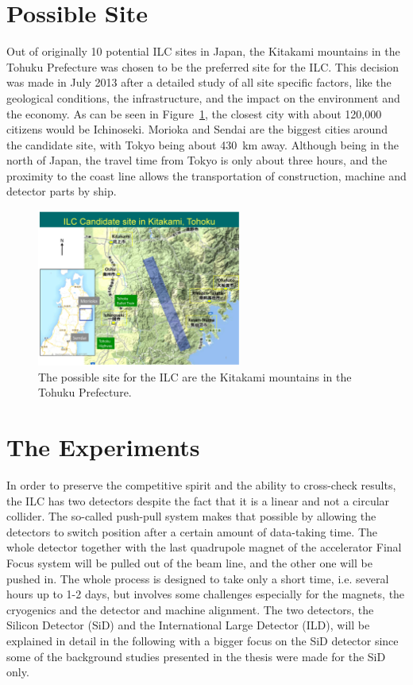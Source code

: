 \section{Possible Site}
\label{ILC:site}
Out of originally 10 potential ILC sites in Japan, the Kitakami mountains in the Tohuku Prefecture was chosen to be the preferred site for the ILC.
This decision was made in July 2013 after a detailed study of all site specific factors, like the geological conditions, the infrastructure, and the impact on the environment and the economy.
As can be seen in Figure~\ref{fig:ILC_Site}, the closest city with about 120,000 citizens would be Ichinoseki.
Morioka and Sendai are the biggest cities around the candidate site, with Tokyo being about \SI{430}{\kilo\meter} away.
Although being in the north of Japan, the travel time from Tokyo is only about three hours, and the proximity to the coast line allows the transportation of construction, machine and detector parts by ship.

\begin{figure}
\centering
\includegraphics[width=0.6\textwidth]{Figures/ILC-site.jpg}
\caption[Possible site for the ILC]{The possible site for the ILC are the Kitakami mountains in the Tohuku Prefecture.\cite{Site}}
\label{fig:ILC_Site}
\end{figure}

\section{The Experiments}
\label{ILC:detectors}

In order to preserve the competitive spirit and the ability to cross-check results, the ILC has two detectors despite the fact that it is a linear and not a circular collider.
The so-called push-pull system makes that possible by allowing the detectors to switch position after a certain amount of data-taking time.
The whole detector together with the last quadrupole magnet of the accelerator Final Focus system will be pulled out of the beam line, and the other one will be pushed in.
The whole process is designed to take only a short time, i.e. several hours up to 1-2 days, but involves some challenges especially for the magnets, the cryogenics and the detector and machine alignment.\cite[p. 28-29]{TDR1}
The two detectors, the Silicon Detector (SiD) and the International Large Detector (ILD), will be explained in detail in the following with a bigger focus on the SiD detector since some of the background studies presented in the thesis were made for the SiD only.

